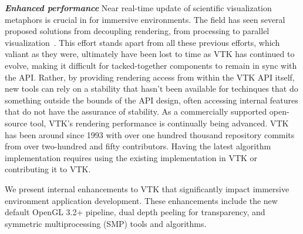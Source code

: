 
\textit{\textbf{Enhanced performance}} Near real-time update of scientific visualization metaphors is crucial in for immersive environments.
The field has seen several proposed solutions from decoupling rendering, from processing to parallel visualization~\cite{Bryson:1996, vanReimersdahl:2000}.
This effort stands apart from all these previous efforts, which valiant
as they were, ultimately have been lost to time as VTK has continued to
evolve, making it difficult for tacked-together components to remain in
sync with the API.
Rather, by providing rendering access from within the VTK API itself, new
tools can rely on a stability that hasn't been available for techinques
that do something outside the bounds of the API design, often accessing
internal features that do not have the assurance of stability.
As a commercially supported open-source tool, VTK's rendering performance is
continually being advanced.
VTK has been around since 1993 with over one hundred thousand repository commits from over two-hundred and fifty contributors.
Having the latest algorithm implementation requires using the existing implementation in VTK or contributing it to VTK.

We present internal enhancements to VTK that significantly impact immersive
environment application development.
These enhancements include the new default OpenGL 3.2+ pipeline,
dual depth peeling for transparency, and symmetric multiprocessing (SMP)
tools and algorithms.


